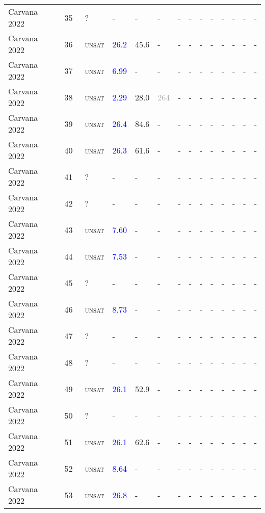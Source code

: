 \begin{center}
{\begin{longtable}{@{}llllllllllllll@{}}
Carvana 2022 & 35 & ~? & - & - & - & - & - & - & - & - & - & - & - \\
Carvana 2022 & 36 & ~\textsc{unsat} & \textcolor{blue}{26.2} & \textcolor{second}{45.6} & - & - & - & - & - & - & - & - & - \\
Carvana 2022 & 37 & ~\textsc{unsat} & \textcolor{blue}{6.99} & - & - & - & - & - & - & - & - & - & - \\
Carvana 2022 & 38 & ~\textsc{unsat} & \textcolor{blue}{2.29} & \textcolor{second}{28.0} & \textcolor{darkgray}{264} & - & - & - & - & - & - & - & - \\
Carvana 2022 & 39 & ~\textsc{unsat} & \textcolor{blue}{26.4} & \textcolor{second}{84.6} & - & - & - & - & - & - & - & - & - \\
Carvana 2022 & 40 & ~\textsc{unsat} & \textcolor{blue}{26.3} & \textcolor{second}{61.6} & - & - & - & - & - & - & - & - & - \\
Carvana 2022 & 41 & ~? & - & - & - & - & - & - & - & - & - & - & - \\
Carvana 2022 & 42 & ~? & - & - & - & - & - & - & - & - & - & - & - \\
Carvana 2022 & 43 & ~\textsc{unsat} & \textcolor{blue}{7.60} & - & - & - & - & - & - & - & - & - & - \\
Carvana 2022 & 44 & ~\textsc{unsat} & \textcolor{blue}{7.53} & - & - & - & - & - & - & - & - & - & - \\
Carvana 2022 & 45 & ~? & - & - & - & - & - & - & - & - & - & - & - \\
Carvana 2022 & 46 & ~\textsc{unsat} & \textcolor{blue}{8.73} & - & - & - & - & - & - & - & - & - & - \\
Carvana 2022 & 47 & ~? & - & - & - & - & - & - & - & - & - & - & - \\
Carvana 2022 & 48 & ~? & - & - & - & - & - & - & - & - & - & - & - \\
Carvana 2022 & 49 & ~\textsc{unsat} & \textcolor{blue}{26.1} & \textcolor{second}{52.9} & - & - & - & - & - & - & - & - & - \\
Carvana 2022 & 50 & ~? & - & - & - & - & - & - & - & - & - & - & - \\
Carvana 2022 & 51 & ~\textsc{unsat} & \textcolor{blue}{26.1} & \textcolor{second}{62.6} & - & - & - & - & - & - & - & - & - \\
Carvana 2022 & 52 & ~\textsc{unsat} & \textcolor{blue}{8.64} & - & - & - & - & - & - & - & - & - & - \\
Carvana 2022 & 53 & ~\textsc{unsat} & \textcolor{blue}{26.8} & - & - & - & - & - & - & - & - & - & - \\

\end{longtable}}
\end{center}
